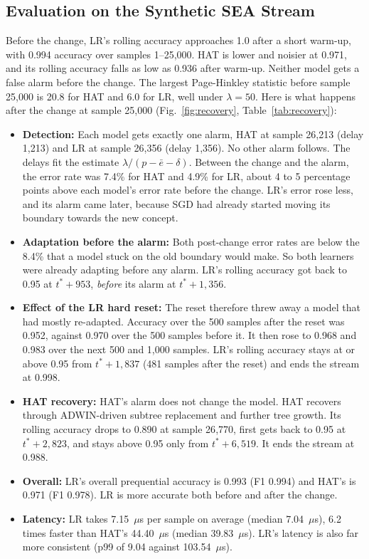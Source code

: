 \documentclass[conference]{IEEEtran}
\begin{document}
\subsection{Evaluation on the Synthetic SEA Stream}
Before the change, LR's rolling accuracy approaches 1.0 after a short warm-up, with 0.994 accuracy over samples 1--25{,}000.
HAT is lower and noisier at 0.971, and its rolling accuracy falls as low as 0.936 after warm-up.
Neither model gets a false alarm before the change.
The largest Page-Hinkley statistic before sample 25{,}000 is 20.8 for HAT and 6.0 for LR, well under $\lambda = 50$.
Here is what happens after the change at sample 25{,}000 (Fig.~\ref{fig:recovery}, Table~\ref{tab:recovery}):
\begin{itemize}
    \item \textbf{Detection:} Each model gets exactly one alarm, HAT at sample 26{,}213 (delay 1{,}213) and LR at sample 26{,}356 (delay 1{,}356). No other alarm follows. The delays fit the estimate $\lambda / (p - \bar{e} - \delta)$. Between the change and the alarm, the error rate was 7.4\% for HAT and 4.9\% for LR, about 4 to 5 percentage points above each model's error rate before the change. LR's error rose less, and its alarm came later, because SGD had already started moving its boundary towards the new concept.
    \item \textbf{Adaptation before the alarm:} Both post-change error rates are below the 8.4\% that a model stuck on the old boundary would make. So both learners were already adapting before any alarm. LR's rolling accuracy got back to 0.95 at $t^* + 953$, \emph{before} its alarm at $t^* + 1{,}356$.
    \item \textbf{Effect of the LR hard reset:} The reset therefore threw away a model that had mostly re-adapted. Accuracy over the 500 samples after the reset was 0.952, against 0.970 over the 500 samples before it. It then rose to 0.968 and 0.983 over the next 500 and 1{,}000 samples. LR's rolling accuracy stays at or above 0.95 from $t^* + 1{,}837$ (481 samples after the reset) and ends the stream at 0.998.
    \item \textbf{HAT recovery:} HAT's alarm does not change the model. HAT recovers through ADWIN-driven subtree replacement and further tree growth. Its rolling accuracy drops to 0.890 at sample 26{,}770, first gets back to 0.95 at $t^* + 2{,}823$, and stays above 0.95 only from $t^* + 6{,}519$. It ends the stream at 0.988.
    \item \textbf{Overall:} LR's overall prequential accuracy is 0.993 (F1 0.994) and HAT's is 0.971 (F1 0.978). LR is more accurate both before and after the change.
    \item \textbf{Latency:} LR takes 7.15~$\mu$s per sample on average (median 7.04~$\mu$s), 6.2 times faster than HAT's 44.40~$\mu$s (median 39.83~$\mu$s). LR's latency is also far more consistent (p99 of 9.04 against 103.54~$\mu$s).
\end{itemize}
\end{document}
